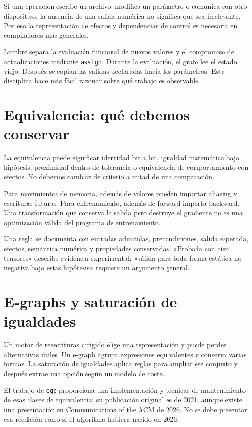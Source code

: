 \documentclass[12pt,a4paper,oneside]{report}
\begin{document}
Si una operación escribe un archivo, modifica un parámetro o comunica con otro dispositivo, la ausencia de una salida numérica no significa que sea irrelevante. Por eso la representación de efectos y dependencias de control es necesaria en compiladores más generales.

Lumbre separa la evaluación funcional de nuevos valores y el compromiso de actualizaciones mediante \texttt{assign}. Durante la evaluación, el grafo lee el estado viejo. Después se copian las salidas declaradas hacia los parámetros. Esta disciplina hace más fácil razonar sobre qué trabajo es observable.

\section{Equivalencia: qué debemos conservar}
La equivalencia puede significar identidad bit a bit, igualdad matemática bajo hipótesis, proximidad dentro de tolerancia o equivalencia de comportamiento con efectos. No debemos cambiar de criterio a mitad de una comparación.

Para movimientos de memoria, además de valores pueden importar aliasing y escrituras futuras. Para entrenamiento, además de forward importa backward. Una transformación que conserva la salida pero destruye el gradiente no es una optimización válida del programa de entrenamiento.

\begin{traduccion}
Una regla se documenta con entradas admitidas, precondiciones, salida esperada, efectos, semántica numérica y propiedades conservadas. «Probada con cien tensores» describe evidencia experimental; «válida para toda forma estática no negativa bajo estas hipótesis» requiere un argumento general.

\end{traduccion}
\section{E-graphs y saturación de igualdades}
Un motor de reescrituras dirigido elige una representación y puede perder alternativas útiles. Un e-graph agrupa expresiones equivalentes y conserva varias formas. La saturación de igualdades aplica reglas para ampliar ese conjunto y después extrae una opción según un modelo de coste.

El trabajo de \texttt{egg} proporciona una implementación y técnicas de mantenimiento de esas clases de equivalencia; su publicación original es de 2021, aunque existe una presentación en Communications of the ACM de 2026. No se debe presentar esa reedición como si el algoritmo hubiera nacido en 2026. \cite{egg}
\end{document}
